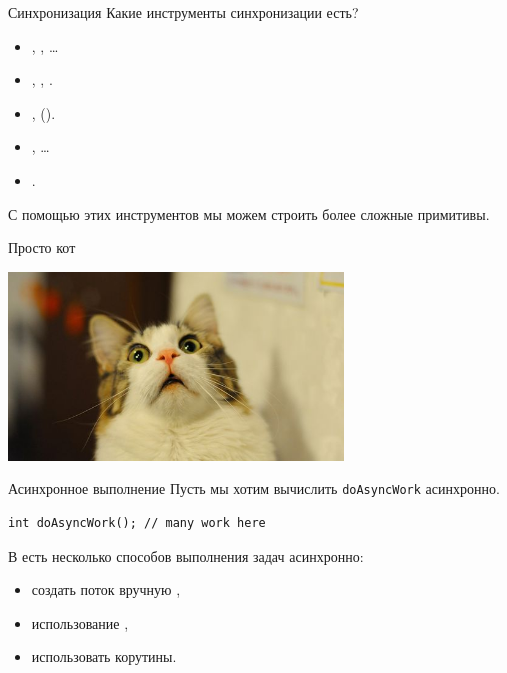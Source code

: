 \documentclass{beamer}
\begin{document}
\begin{frame}[fragile]{Синхронизация}
    Какие инструменты синхронизации есть?
    \begin{itemize}
        \item {}, , \dots
        \item {}, , .
        \item {},  (\langcpp[20]).
        \item {}, \dots
        \item {}.
    \end{itemize}
    С помощью этих инструментов мы можем строить более сложные примитивы.
\end{frame}

\begin{frame}[fragile]{Просто кот}
    \begin{center}
        \includegraphics[height=50mm]{cat.jpg}
    \end{center}
\end{frame}

\begin{frame}[fragile]{Асинхронное выполнение}
Пусть мы хотим вычислить \texttt{doAsyncWork} асинхронно.
\begin{lstlisting}
int doAsyncWork(); // many work here
\end{lstlisting}

В \langcpp есть несколько способов выполнения задач асинхронно:
\begin{itemize}
    \item создать поток вручную ,
    \item использование ,
    \item использовать корутины.
\end{itemize}
\end{frame}
\end{document}
